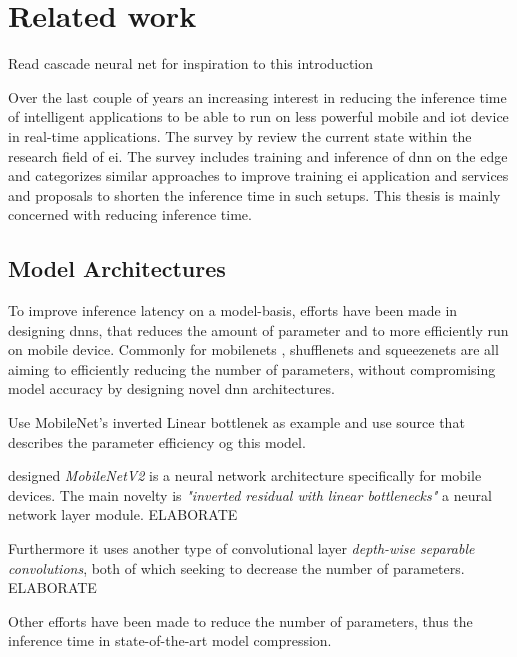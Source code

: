 \section{Related work}

Read cascade neural net for inspiration to this introduction

Over the last couple of years an increasing interest in reducing the inference time of intelligent applications to be able to run on less powerful mobile and \gls{iot} device in real-time applications. The survey  by \citet{zhou_edge_2019} review the current state within the research field of \gls{ei}. The survey includes training and inference of \gls{dnn} on the edge and categorizes similar approaches to improve training \gls{ei} application and services and proposals to shorten the inference time in such setups. This thesis is mainly concerned with reducing inference time.

\subsection{Model Architectures}

To improve inference latency on a model-basis, efforts have been made in designing \gls{dnn}s, that reduces the amount of parameter and to more efficiently run on mobile device. Commonly for \gls{mobilenet}s \cite{howard_mobilenets:_2017,sandler_mobilenetv2:_2018}, \gls{shufflenet}s \cite{zhang_shufflenet:_2017, ma_shufflenet_2018} and \gls{squeezenet}s \cite{iandola_squeezenet:_2016} are all aiming to efficiently reducing the number of parameters, without compromising model accuracy by designing novel \gls{dnn} architectures.

Use MobileNet's inverted Linear bottlenek as example and use source that describes the parameter efficiency og this model. 

\citeauthor{sandler_mobilenetv2:_2018} designed \textsl{MobileNetV2} is a neural network architecture specifically for mobile devices. The main novelty is \textit{"inverted residual with linear bottlenecks"} a neural network layer module. ELABORATE

Furthermore it uses another type of convolutional layer \textit{depth-wise separable convolutions}, both of which seeking to decrease the number of parameters. ELABORATE

Other efforts have been made to reduce the number of parameters, thus the inference time in state-of-the-art model compression. 

